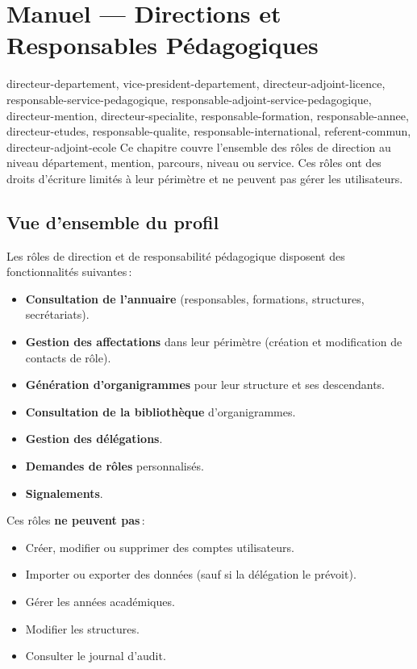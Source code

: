 \chapter{Manuel --- Directions et Responsables P\'edagogiques}
\label{chap:directions}

\begin{rolebox}{directeur-departement, vice-president-departement, directeur-adjoint-licence, responsable-service-pedagogique, responsable-adjoint-service-pedagogique, directeur-mention, directeur-specialite, responsable-formation, responsable-annee, directeur-etudes, responsable-qualite, responsable-international, referent-commun, directeur-adjoint-ecole}
  Ce chapitre couvre l'ensemble des r\^oles de direction au niveau d\'epartement, mention, parcours, niveau ou service. Ces r\^oles ont des droits d'\'ecriture limit\'es \`a leur p\'erim\`etre et ne peuvent pas g\'erer les utilisateurs.
\end{rolebox}

\section{Vue d'ensemble du profil}

Les r\^oles de direction et de responsabilit\'e p\'edagogique disposent des fonctionnalit\'es suivantes\,:

\begin{itemize}
  \item \textbf{Consultation de l'annuaire} (responsables, formations, structures, secr\'etariats).
  \item \textbf{Gestion des affectations} dans leur p\'erim\`etre (cr\'eation et modification de contacts de r\^ole).
  \item \textbf{G\'en\'eration d'organigrammes} pour leur structure et ses descendants.
  \item \textbf{Consultation de la biblioth\`eque} d'organigrammes.
  \item \textbf{Gestion des d\'el\'egations}.
  \item \textbf{Demandes de r\^oles} personnalis\'es.
  \item \textbf{Signalements}.
\end{itemize}

\begin{notebox}
  Ces r\^oles \textbf{ne peuvent pas}\,:
  \begin{itemize}
    \item Cr\'eer, modifier ou supprimer des comptes utilisateurs.
    \item Importer ou exporter des donn\'ees (sauf si la d\'el\'egation le pr\'evoit).
    \item G\'erer les ann\'ees acad\'emiques.
    \item Modifier les structures.
    \item Consulter le journal d'audit.
  \end{itemize}
\end{notebox}

